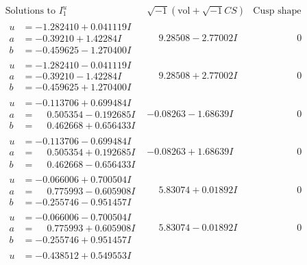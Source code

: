 \documentclass[1p]{elsarticle_modified}
\theoremstyle{definition}
\newcommand{\I}{\sqrt{-1}}
\begin{document}
$$\begin{array}{c|c|c}
\text{Solutions to }I^u_{1}& \I (\text{vol} + \sqrt{-1}CS) & \text{Cusp shape}\\
 \hline 
\begin{aligned}
u &= -1.282410 + 0.041119 I \\
a &= -0.39210 + 1.42284 I \\
b &= -0.459625 - 1.270400 I\end{aligned}
 & \phantom{-}9.28508 - 2.77002 I & \phantom{-0.000000 } 0 \\ \hline\begin{aligned}
u &= -1.282410 - 0.041119 I \\
a &= -0.39210 - 1.42284 I \\
b &= -0.459625 + 1.270400 I\end{aligned}
 & \phantom{-}9.28508 + 2.77002 I & \phantom{-0.000000 } 0 \\ \hline\begin{aligned}
u &= -0.113706 + 0.699484 I \\
a &= \phantom{-}0.505354 - 0.192685 I \\
b &= \phantom{-}0.462668 + 0.656433 I\end{aligned}
 & -0.08263 - 1.68639 I & \phantom{-0.000000 } 0 \\ \hline\begin{aligned}
u &= -0.113706 - 0.699484 I \\
a &= \phantom{-}0.505354 + 0.192685 I \\
b &= \phantom{-}0.462668 - 0.656433 I\end{aligned}
 & -0.08263 + 1.68639 I & \phantom{-0.000000 } 0 \\ \hline\begin{aligned}
u &= -0.066006 + 0.700504 I \\
a &= \phantom{-}0.775993 - 0.605908 I \\
b &= -0.255746 - 0.951457 I\end{aligned}
 & \phantom{-}5.83074 + 0.01892 I & \phantom{-0.000000 } 0 \\ \hline\begin{aligned}
u &= -0.066006 - 0.700504 I \\
a &= \phantom{-}0.775993 + 0.605908 I \\
b &= -0.255746 + 0.951457 I\end{aligned}
 & \phantom{-}5.83074 - 0.01892 I & \phantom{-0.000000 } 0 \\ \hline\begin{aligned}
u &= -0.438512 + 0.549553 I \\

\end{aligned}
\end{array}$$
\end{document}
